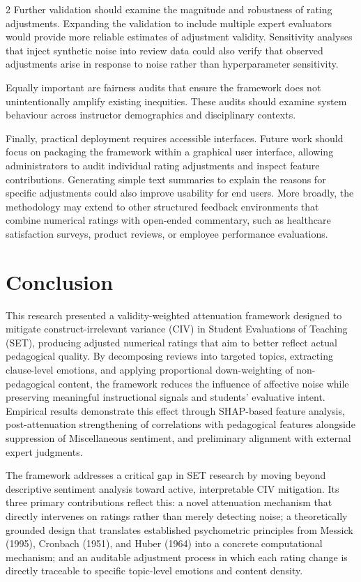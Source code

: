 \documentclass{article}
\begin{document}
\begin{multicols*}{2}
Further validation should examine the magnitude and robustness of rating adjustments. Expanding the validation to include multiple expert evaluators would provide more reliable estimates of adjustment validity. Sensitivity analyses that inject synthetic noise into review data could also verify that observed adjustments arise in response to noise rather than hyperparameter sensitivity.

Equally important are fairness audits that ensure the framework does not unintentionally amplify existing inequities. These audits should examine system behaviour across instructor demographics and disciplinary contexts.

Finally, practical deployment requires accessible interfaces. Future work should focus on packaging the framework within a graphical user interface, allowing administrators to audit individual rating adjustments and inspect feature contributions. Generating simple text summaries to explain the reasons for specific adjustments could also improve usability for end users. More broadly, the methodology may extend to other structured feedback environments that combine numerical ratings with open-ended commentary, such as healthcare satisfaction surveys, product reviews, or employee performance evaluations.

\section{Conclusion}
This research presented a validity-weighted attenuation framework designed to mitigate construct-irrelevant variance (CIV) in Student Evaluations of Teaching (SET), producing adjusted numerical ratings that aim to better reflect actual pedagogical quality. By decomposing reviews into targeted topics, extracting clause-level emotions, and applying proportional down-weighting of non-pedagogical content, the framework reduces the influence of affective noise while preserving meaningful instructional signals and students' evaluative intent. Empirical results demonstrate this effect through SHAP-based feature analysis, post-attenuation strengthening of correlations with pedagogical features alongside suppression of Miscellaneous sentiment, and preliminary alignment with external expert judgments.

The framework addresses a critical gap in SET research by moving beyond descriptive sentiment analysis toward active, interpretable CIV mitigation. Its three primary contributions reflect this: a novel attenuation mechanism that directly intervenes on ratings rather than merely detecting noise; a theoretically grounded design that translates established psychometric principles from Messick (1995), Cronbach (1951), and Huber (1964) into a concrete computational mechanism; and an auditable adjustment process in which each rating change is directly traceable to specific topic-level emotions and content density.


\end{multicols*}
\end{document}
